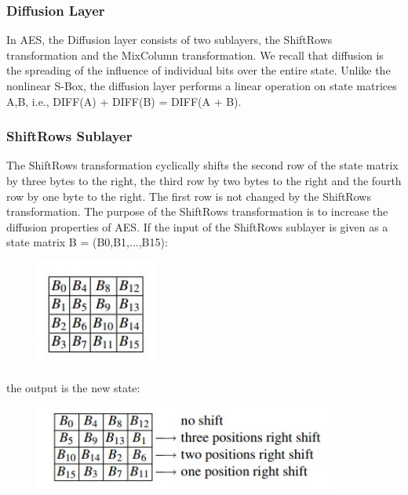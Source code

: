 \documentclass[../main.tex]{subfiles}
\begin{document}
\subsubsection{Diffusion Layer}
In AES, the Diffusion layer consists of two sublayers, the ShiftRows transformation
and the MixColumn transformation. We recall that diffusion is the spreading of the
influence of individual bits over the entire state. Unlike the nonlinear S-Box, the diffusion layer performs a linear operation on state matrices A,B, i.e., DIFF(A) +
DIFF(B) = DIFF(A + B).\cite{10.5555/1721909}

\subsubsection{ShiftRows Sublayer}
The ShiftRows transformation cyclically shifts the second row of the state matrix
by three bytes to the right, the third row by two bytes to the right and the fourth
row by one byte to the right. The first row is not changed by the ShiftRows transformation. The purpose of the ShiftRows transformation is to increase the diffusion
properties of AES. If the input of the ShiftRows sublayer is given as a state matrix
B = (B0,B1,...,B15):
\begin{figure}[h]
\centering
\includegraphics[width=4cm]{diagrams/cryp10.jpg}
\end{figure}
the output is the new state:
\begin{figure}[h]
\centering
\includegraphics[width=10cm]{diagrams/cryp11.jpg}
\end{figure}
\end{document}

